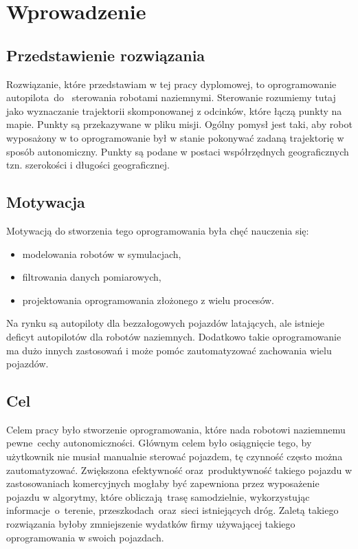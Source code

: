 \newpage

\section{Wprowadzenie}\label{introduction}
{
    
    \subsection{Przedstawienie rozwiązania}
    {
    Rozwiązanie, które przedstawiam w tej pracy dyplomowej, to oprogramowanie autopilota~do ~sterowania robotami naziemnymi. Sterowanie rozumiemy tutaj jako wyznaczanie trajektorii skomponowanej z odcinków, które łączą punkty na mapie. Punkty są przekazywane w pliku misji. Ogólny pomysł jest taki, aby robot wyposażony w to oprogramowanie był w stanie pokonywać zadaną trajektorię w sposób autonomiczny.  Punkty są podane w postaci współrzędnych geograficznych tzn. szerokości i długości geograficznej.
    }
    
    \subsection{Motywacja}
    {
        Motywacją do stworzenia tego oprogramowania była chęć nauczenia się: 
        \begin{itemize}
            \item modelowania robotów w symulacjach,
            \item filtrowania danych pomiarowych,
            \item projektowania oprogramowania złożonego z wielu procesów.
        \end{itemize}
         Na rynku są autopiloty dla bezzałogowych pojazdów latających, ale istnieje deficyt autopilotów dla robotów naziemnych. Dodatkowo takie oprogramowanie ma dużo innych zastosowań i może pomóc zautomatyzować zachowania wielu pojazdów. 
    }
    
    \subsection{Cel}
    {
        Celem pracy było stworzenie oprogramowania, które nada robotowi naziemnemu pewne~cechy autonomiczności. Głównym celem było osiągnięcie tego, by użytkownik nie musiał manualnie sterować pojazdem, tę czynność często można zautomatyzować. Zwiększona efektywność oraz~produktywność takiego pojazdu w zastosowaniach komercyjnych mogłaby być zapewniona przez wyposażenie pojazdu w algorytmy, które obliczają trasę samodzielnie, wykorzystując informacje~o~terenie, przeszkodach~oraz~sieci istniejących dróg.  Zaletą takiego rozwiązania byłoby zmniejszenie wydatków firmy używającej takiego oprogramowania w swoich pojazdach.
    }
    
}
